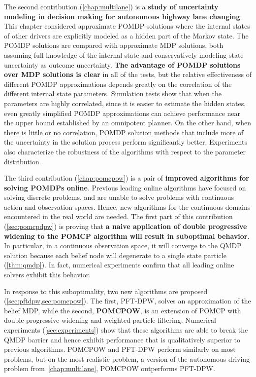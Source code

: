 The second contribution (\cref{chap:multilane}) is a \textbf{study of uncertainty modeling in decision making for autonomous highway lane changing}.
This chapter considered approximate POMDP solutions where the internal states of other drivers are explicitly modeled as a hidden part of the Markov state.
The POMDP solutions are compared with approximate MDP solutions, both assuming full knowledge of the internal state and conservatively modeling state uncertainty as outcome uncertainty.
\textbf{The advantage of POMDP solutions over MDP solutions is clear} in all of the tests, but the relative effectiveness of different POMDP approximations depends greatly on the correlation of the different internal state parameters.
Simulation tests show that when the parameters are highly correlated, since it is easier to estimate the hidden states, even greatly simplified POMDP approximations can achieve performance near the upper bound established by an omnipotent planner.
On the other hand, when there is little or no correlation, POMDP solution methods that include more of the uncertainty in the solution process perform significantly better.
Experiments also characterize the robustness of the algorithms with respect to the parameter distribution.

The third contribution (\cref{chap:pomcpow}) is a pair of \textbf{improved algorithms for solving POMDPs online}.
Previous leading online algorithms have focused on solving discrete problems, and are unable to solve problems with continuous action and observation spaces.
Hence, new algorithms for the continuous domains encountered in the real world are needed.
The first part of this contribution (\cref{sec:pomcpdpw}) is proving that \textbf{a naive application of double progressive widening to the POMCP algorithm will result in suboptimal behavior}.
In particular, in a continuous observation space, it will converge to the QMDP solution because each belief node will degenerate to a single state particle (\cref{thm:qmdp}).
In fact, numerical experiments confirm that all leading online solvers exhibit this behavior.

In response to this suboptimality, two new algorithms are proposed (\cref{sec:pftdpw,sec:pomcpow}).
The first, PFT-DPW, solves an approximation of the belief MDP, while the second, \textbf{POMCPOW}, is an extension of POMCP with double progressive widening and weighted particle filtering.
Numerical experiments (\cref{sec:experiments}) show that these algorithms are able to break the QMDP barrier and hence exhibit performance that is qualitatively superior to previous algorithms.
POMCPOW and PFT-DPW perform similarly on most problems, but on the most realistic problem, a version of the autonomous driving problem from~\cref{chap:multilane}, POMCPOW outperforms PFT-DPW.

